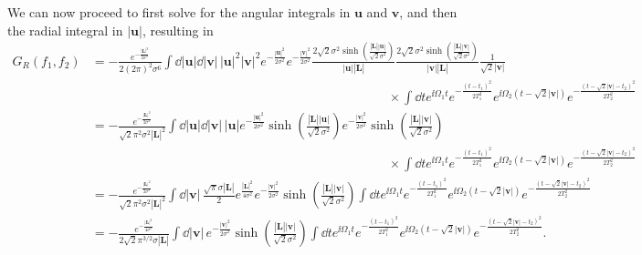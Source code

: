 We can now proceed to first solve for the angular integrals in $\bm u$ and $\bm v$, and then the radial integral in $|\bm u|$, resulting in{\footnotesize
\begin{align}
    G_R(f_1,f_2) & = -\frac{e^{- \frac{|\bm L|^2}{2\sigma^2}}}{2(2\pi)^2 \sigma^6} \int   \dd |\bm u| \dd |\bm v| \,|\bm u|^2 |\bm v|^2 e^{-\frac{|\bm u|^2}{2\sigma^2}}e^{-\frac{|\bm v|^2}{2\sigma^2}} \frac{2\sqrt{2} \sigma^2\sinh(\frac{|\bm L||\bm u|}{\sqrt{2}\sigma^2})}{|\bm u||\bm L|}\frac{2\sqrt{2} \sigma^2\sinh(\frac{|\bm L||\bm v|}{\sqrt{2}\sigma^2})}{|\bm v||\bm L|}\frac{1}{\sqrt{2}|\bm v|}\nonumber \\
    &\:\:\:\:\:\:\:\:\:\:\:\:\:\:\:\:\:\:\:\:\:\:\:\:\:\:\:\:\:\:\:\:\:\:\:\:\:\:\:\:\:\:\:\:\:\:\:\:\:\:\:\:\:\:\:\:\:\:\:\:\:\:\:\:\:\:\:\:\:\:\:\:\:\:\:\:\:\:\:\:\:\:\:\:\:\:\:\:\:\:\:\:\:\:\:\:\:\:\:\:\:\:\:\:\:\times\int \dd t e^{\ii \Omega_1 t} e^{- \frac{(t-t_1)^2}{2T_1^2}}e^{\ii \Omega_2 (t - \sqrt{2}|\bm v|)} e^{- \frac{(t - \sqrt{2}|\bm v|-t_2)^2}{2T_2^2}}\nonumber\\
    & = -\frac{e^{- \frac{|\bm L|^2}{2\sigma^2}}}{\sqrt{2}\pi^2\sigma^2|\bm L|^2} \int  \dd |\bm u| \dd |\bm v| \,|\bm u| e^{-\frac{|\bm u|^2}{2\sigma^2}} \sinh(\frac{|\bm L||\bm u|}{\sqrt{2}\sigma^2})e^{-\frac{|\bm v|^2}{2\sigma^2}}\sinh(\frac{|\bm L||\bm v|}{\sqrt{2}\sigma^2})\nonumber\\
    &\:\:\:\:\:\:\:\:\:\:\:\:\:\:\:\:\:\:\:\:\:\:\:\:\:\:\:\:\:\:\:\:\:\:\:\:\:\:\:\:\:\:\:\:\:\:\:\:\:\:\:\:\:\:\:\:\:\:\:\:\:\:\:\:\:\:\:\:\:\:\:\:\:\:\:\:\:\:\:\:\:\:\:\:\:\:\:\:\:\:\:\:\:\:\:\:\:\:\:\:\:\:\:\:\:\times \int \dd t e^{\ii \Omega_1 t} e^{- \frac{(t-t_1)^2}{2T_1^2}}e^{\ii \Omega_2 (t - \sqrt{2}|\bm v|)} e^{- \frac{(t - \sqrt{2}|\bm v|-t_2)^2}{2T_2^2}}\nonumber\\
    & = -\frac{e^{- \frac{|\bm L|^2}{2\sigma^2}}}{\sqrt{2}\pi^2\sigma^2|\bm L|^2} \int  \dd |\bm v| \, \frac{\sqrt{\pi}\sigma |\bm L|}{2}e^{\frac{|\bm L|^2}{4 \sigma^2}}e^{-\frac{|\bm v|^2}{2\sigma^2}} \sinh(\frac{|\bm L||\bm v|}{\sqrt{2}\sigma^2}) \int \dd te^{\ii \Omega_1 t} e^{- \frac{(t-t_1)^2}{2T_1^2}}e^{\ii \Omega_2 (t - \sqrt{2}|\bm v|)} e^{- \frac{(t - \sqrt{2}|\bm v|-t_2)^2}{2T_2^2}}\nonumber\\
    & = -\frac{e^{- \frac{|\bm L|^2}{4\sigma^2}}}{2\sqrt{2}\pi^{3/2}\sigma|\bm L|} \int \dd |\bm v| \, e^{-\frac{|\bm v|^2}{2\sigma^2}} \sinh(\frac{|\bm L||\bm v|}{\sqrt{2}\sigma^2}) \int \dd t e^{\ii \Omega_1 t} e^{- \frac{(t-t_1)^2}{2T_1^2}}e^{\ii \Omega_2 (t - \sqrt{2}|\bm v|)} e^{- \frac{(t - \sqrt{2}|\bm v|-t_2)^2}{2T_2^2}}.\label{eq:GRfinalInt}
\end{align}}
